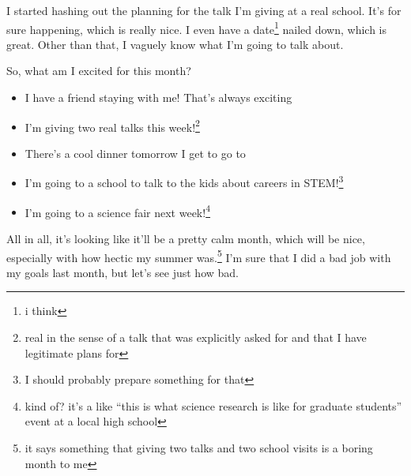 \documentclass[12pt]{article}[titlepage]
\newcommand{\say}[1]{``#1''}
\renewcommand{\,}{\textsuperscript{,}}
\begin{document}
I started hashing out the planning for the talk I'm giving at a real school.
It's for sure happening, which is really nice.
I even have a date\footnote{i think} nailed down, which is great.
Other than that, I vaguely know what I'm going to talk about.

So, what am I excited for this month?
\begin{itemize}
\item I have a friend staying with me! That's always exciting
\item I'm giving two real talks this week!\footnote{real in the sense of a talk that was explicitly asked for and that I have legitimate plans for}
\item There's a cool dinner tomorrow I get to go to
\item I'm going to a school to talk to the kids about careers in STEM!\footnote{I should probably prepare something for that}
\item I'm going to a science fair next week!\footnote{kind of? it's a like \say{this is what science research is like for graduate students} event at a local high school}
\end{itemize}

All in all, it's looking like it'll be a pretty calm month, which will be nice, especially with how hectic my summer was.\footnote{it says something that giving two talks and two school visits is a boring month to me}
I'm sure that I did a bad job with my goals last month, but let's see just how bad.
\end{document}
